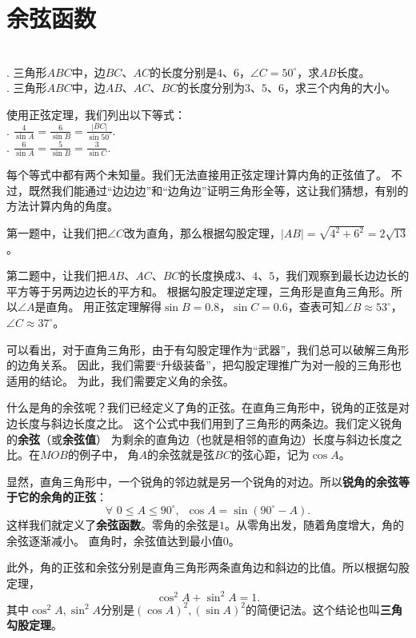\documentclass[12pt,UTF8]{ctexbook}
\begin{document}
\section{余弦函数}
\begin{ex}\label{ex:2-2-10}
    \mbox{} \\
    . 三角形$ABC$中，边$BC$、$AC$的长度分别是$4$、$6$，$\angle C = 50^\circ$，求$AB$长度。\\
    . 三角形$ABC$中，边$AB$、$AC$、$BC$的长度分别为$3$、$5$、$6$，求三个内角的大小。
\end{ex}
使用正弦定理，我们列出以下等式：\\
. $ \frac{4}{\sin A} = \frac{6}{\sin B} = \frac{|BC|}{\sin 50^\circ}.$ \\
. $ \frac{6}{\sin A} = \frac{5}{\sin B} = \frac{3}{\sin C}.$

每个等式中都有两个未知量。我们无法直接用正弦定理计算内角的正弦值了。
不过，既然我们能通过“边边边”和“边角边”证明三角形全等，这让我们猜想，有别的方法计算内角的角度。

第一题中，让我们把$\angle C$改为直角，那么根据勾股定理，$|AB| = \sqrt{4^2+6^2} = 2\sqrt{13}$。

第二题中，让我们把$AB$、$AC$、$BC$的长度换成$3$、$4$、$5$，我们观察到最长边边长的平方等于另两边边长的平方和。
根据勾股定理逆定理，三角形是直角三角形。所以$\angle A$是直角。
用正弦定理解得$\sin B = 0.8$，$\sin C = 0.6$，查表可知$\angle B \approx 53^\circ$，
$\angle C \approx 37^\circ$。

可以看出，对于直角三角形，由于有勾股定理作为“武器”，我们总可以破解三角形的边角关系。
因此，我们需要“升级装备”，把勾股定理推广为对一般的三角形也适用的结论。
为此，我们需要定义角的余弦。

什么是角的余弦呢？我们已经定义了角的正弦。在直角三角形中，锐角的正弦是对边长度与斜边长度之比。
这个公式中我们用到了三角形的两条边。我们定义锐角的\textbf{余弦}（或\textbf{余弦值}）
为剩余的直角边（也就是相邻的直角边）长度与斜边长度之比。在$MOB$的例子中，
角$A$的余弦就是弦$BC$的弦心距，记为$\cos A$。

显然，直角三角形中，一个锐角的邻边就是另一个锐角的对边。所以\textbf{锐角的余弦等于它的余角的正弦}：
$$ \forall \,\, 0 \leqslant A \leqslant 90^\circ, \,\,\, \cos A = \sin (90^\circ - A). $$
这样我们就定义了\textbf{余弦函数}。零角的余弦是$1$。从零角出发，随着角度增大，角的余弦逐渐减小。
直角时，余弦值达到最小值$0$。

此外，角的正弦和余弦分别是直角三角形两条直角边和斜边的比值。所以根据勾股定理，
$$ \cos^2 A + \sin^2 A = 1.$$
其中$\cos^2 A, \sin^2 A$分别是$(\cos A)^2, (\sin A)^2$的简便记法。这个结论也叫\textbf{三角勾股定理}。
\end{document}
